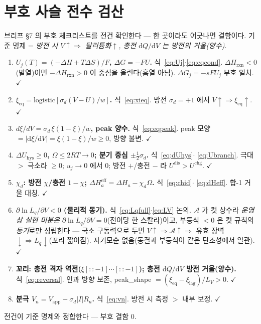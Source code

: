 \documentclass[11pt,a4paper]{article}
\newcommand{\dd}{\mathrm{d}}
\newcommand{\eff}{\mathrm{eff}}
\newcommand{\eq}{\mathrm{eq}}
\newcommand{\app}{\mathrm{app}}
\newcommand{\rxn}{\mathrm{rxn}}
\newcommand{\dis}{\mathrm{dis}}
\newcommand{\chg}{\mathrm{chg}}
\newcommand{\hys}{\mathrm{hys}}
\begin{document}
\section{부호 사슬 전수 검산}\label{sec:signcheck}
브리프 §7 의 부호 체크리스트를 전건 확인한다 — 한 곳이라도 어긋나면 결함이다. 기준 명제 = \emph{방전 시
$V\!\uparrow\Rightarrow$ 탈리튬화$\uparrow$, 충전 $\dd Q/\dd V$ 는 방전의 거울(양수)}.

\begin{enumerate}[label=\textbf{S\arabic*.},leftmargin=2.6em,itemsep=2pt]
\item \textbf{$U_j(T)=(-\Delta H+T\Delta S)/F$, $\Delta G=-FU$.} 식~\eqref{eq:Uj}$\cdot$\eqref{eq:eqcond}. $\Delta H_\rxn<0$
(발열)이면 $-\Delta H_\rxn>0$ 이 중심을 올린다(흡열 아님). $\Delta G_j=-sFU_j$ 부호 일치. $\checkmark$
\item \textbf{$\xi_\eq=\mathrm{logistic}[\sigma_d(V-U)/w]$.} 식~\eqref{eq:xieq}. 방전 $\sigma_d=+1$ 에서
$V\!\uparrow\Rightarrow\xi_\eq\!\uparrow$. $\checkmark$
\item \textbf{$d\xi/dV=\sigma_d\,\xi(1-\xi)/w$, peak 양수.} 식~\eqref{eq:eqpeak}. peak 모양 $=|\dd\xi/\dd V|=
\xi(1-\xi)/w\ge0$, 방향 불변. $\checkmark$
\item \textbf{$\Delta U_\hys\ge0$, $\Omega\le2RT\to0$; 분기 중심 $\pm\tfrac12\sigma_d$.} 식~\eqref{eq:dUhys}$\cdot$
\eqref{eq:Ubranch}. 극대 $>$ 극소라 $\ge0$; $u_j\to0$ 에서 $0$; 방전 $+$/충전 $-$ 라 $U^{\dis}>U^{\chg}$. $\checkmark$
\item \textbf{$\chi_d$: 방전 $\chi$/충전 $1-\chi$; $\Delta H_a^\eff=\Delta H_a-\chi_d\Omega$.} 식~\eqref{eq:chid}$\cdot$
\eqref{eq:dHeff}. 합-1 거울 대칭. $\checkmark$
\item \textbf{$\partial\ln L_q/\partial V<0$ (물리적 동기).} 식~\eqref{eq:Lqfull}$\cdot$\eqref{eq:LV} 논의. $\mathcal A$ 가
컷 상수라 \emph{운영상 실현 미분은} $\partial\ln L_q/\partial V=0$(전이당 한 스칼라)이고, 부등식 $<0$ 은 컷 규칙의
\emph{동기}로만 성립한다 — 국소 구동력으로 두면 $V\!\uparrow\Rightarrow\mathcal A\!\uparrow\Rightarrow$ 유효 장벽
$\downarrow\Rightarrow L_q\downarrow$(꼬리 짧아짐). 자기모순 없음(동결과 부등식이 같은 단조성에서 일관). $\checkmark$
\item \textbf{꼬리: 충전 격자 역전($\xi[::-1]\cdots[::-1]$); 충전 $\dd Q/\dd V$ 방전 거울(양수).} 식~\eqref{eq:reversal}.
인과 방향 보존, peak\_shape $=(\xi_\eq-\xi_\mathrm{lag})/L_V>0$. $\checkmark$
\item \textbf{분극 $V_n=V_\app-\sigma_d|I|R_n$.} 식~\eqref{eq:vn}. 방전 시 측정 $>$ 내부 보정. $\checkmark$
\end{enumerate}
전건이 기준 명제와 정합한다 — 부호 결함 $0$.
\end{document}
